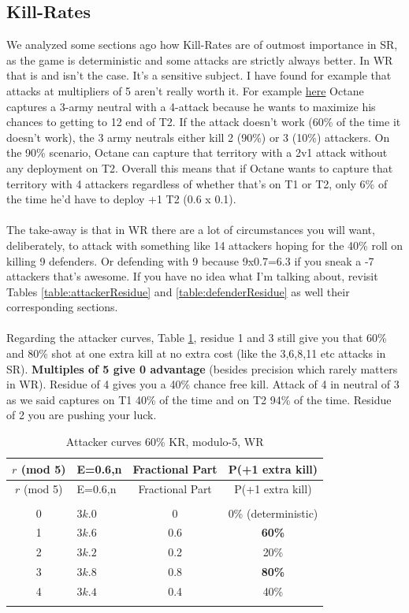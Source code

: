 \subsection{Kill-Rates}

We analyzed some sections ago how Kill-Rates are of outmost importance in SR, as the game is deterministic and some attacks are strictly always better. In WR that is and isn't the case. It's a sensitive subject. I have found for example that attacks at multipliers of 5 aren't really worth it. For example \href{https://www.warzone.com/MultiPlayer?GameID=30166708}{here} Octane captures a 3-army neutral with a 4-attack because he wants to maximize his chances to getting to 12 end of T2. If the attack doesn't work (60\% of the time it doesn't work), the 3 army neutrals either kill 2 (90\%) or 3 (10\%) attackers. On the 90\% scenario, Octane can capture that territory with a 2v1 attack without any deployment on T2. Overall this means that if Octane wants to capture that territory with 4 attackers regardless of whether that's on T1 or T2, only 6\% of the time he'd have to deploy +1 T2 (0.6 x 0.1). 
\\
\\
The take-away is that in WR there are a lot of circumstances you will want, deliberately, to attack with something like 14 attackers hoping for the 40\% roll on killing 9 defenders. Or defending with 9 because 9x0.7=6.3 if you sneak a -7 attackers that's awesome. If you have no idea what I'm talking about, revisit Tables \ref{table:attackerResidue} and \ref{table:defenderResidue} as well their corresponding sections.
\\
\\
Regarding the attacker curves, Table \ref{table:attackerResidue_WR}, residue 1 and 3 still give you that 60\% and 80\% shot at one extra kill at no extra cost (like the 3,6,8,11 etc attacks in SR). \textbf{Multiples of 5 give 0 advantage} (besides precision which rarely matters in WR). Residue of 4 gives you a 40\% chance free kill. Attack of 4 in neutral of 3 as we said captures on T1 40\% of the time and on T2 94\% of the time. Residue of 2 you are pushing your luck.

\small
\begin{longtable}{|c|l|c|c|}
\hline
\rowcolor{Baby_Blue}
$r$ (mod 5) & E=0.6,n & Fractional Part & P(+1 extra kill) \\ 
\hline\hline
\endfirsthead
\hline
\rowcolor{Baby_Blue}
$r$ (mod 5) & E=0.6,n & Fractional Part & P(+1 extra kill) \\  \\ 
\hline\hline
\endhead
0 & $3k.0$ & 0 & 0\% (deterministic) \\ 
1 & $3k.6$ & 0.6 & \textbf{60\%} \\
2 & $3k.2$ & 0.2 & 20\% \\
3 & $3k.8$ & 0.8 & \textbf{80\%} \\
4 & $3k.4$ & 0.4 & 40\%  \\
\hline
\caption{Attacker curves 60\% KR, modulo-5, WR}
\label{table:attackerResidue_WR}
\end{longtable}
\normalsize

